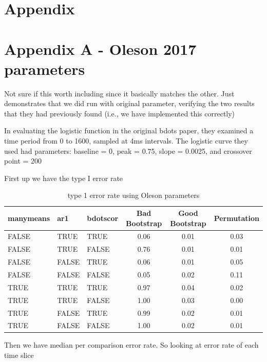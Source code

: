 \documentclass{article}
\begin{document}

\section*{Appendix}

\section*{Appendix A - Oleson 2017 parameters}

Not sure if this worth including since it basically matches the other. Just demonstrates that we did run with original parameter, verifying the two results that they had previously found (i.e., we have implemented this correctly)

In evaluating the logistic function in the original bdots paper, they examined a time period from 0 to 1600, sampled at 4ms intervals. The logistic curve they used had parameters: baseline = 0, peak = 0.75, slope = 0.0025, and crossover point = 200

First up we have the type I error rate

\begin{table}[H]
\centering
\begin{tabular}{lllccc}
  \hline
  manymeans & ar1 & bdotscor &  Bad Bootstrap & Good Bootstrap & Permutation  \\ 
  \hline
FALSE & TRUE & TRUE & 0.06 & 0.01 & 0.03 \\ 
  FALSE & TRUE & FALSE & 0.76 & 0.01 & 0.01 \\ 
  FALSE & FALSE & TRUE & 0.06 & 0.01 & 0.05 \\ 
  FALSE & FALSE & FALSE & 0.05 & 0.02 & 0.11 \\ 
  TRUE & TRUE & TRUE & 0.97 & 0.04 & 0.02 \\ 
  TRUE & TRUE & FALSE & 1.00 & 0.03 & 0.00 \\ 
  TRUE & FALSE & TRUE & 0.99 & 0.02 & 0.01 \\ 
  TRUE & FALSE & FALSE & 1.00 & 0.02 & 0.01 \\ 
   \hline
\end{tabular}
\caption{type 1 error rate using Oleson parameters}
\end{table}

Then we have median per comparison error rate. So looking at error rate of each time slice
\end{document}
